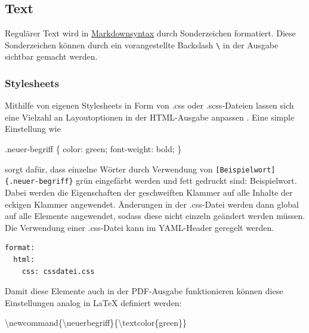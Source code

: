 \documentclass[
  letterpaper,
  DIV=11]{scrartcl}
\newenvironment{Shaded}{\begin{snugshade}}{\end{snugshade}}
\newcommand{\CharTok}[1]{\textcolor[rgb]{0.13,0.47,0.30}{#1}}
\newcommand{\ConstantTok}[1]{\textcolor[rgb]{0.56,0.35,0.01}{#1}}
\newcommand{\DecValTok}[1]{\textcolor[rgb]{0.68,0.00,0.00}{#1}}
\newcommand{\ExtensionTok}[1]{\textcolor[rgb]{0.00,0.23,0.31}{#1}}
\newcommand{\FunctionTok}[1]{\textcolor[rgb]{0.28,0.35,0.67}{#1}}
\newcommand{\KeywordTok}[1]{\textcolor[rgb]{0.00,0.23,0.31}{#1}}
\newcommand{\NormalTok}[1]{\textcolor[rgb]{0.00,0.23,0.31}{#1}}
\newcommand{\OperatorTok}[1]{\textcolor[rgb]{0.37,0.37,0.37}{#1}}
\begin{document}
\subsection{Text}\label{text}

Regulärer Text wird in
\href{https://quarto.org/docs/authoring/markdown-basics.html\#overview}{Markdownsyntax}
durch Sonderzeichen formatiert. Diese Sonderzeichen können durch ein
vorangestellte Backslash \texttt{\textbackslash{}} in der Ausgabe
sichtbar gemacht werden.

\subsubsection{Stylesheets}\label{stylesheets}

Mithilfe von eigenen Stylesheets in Form von .css oder .scss-Dateien
lassen sich eine Vielzahl an Layoutoptionen in der HTML-Ausgabe anpassen
\autocite{W3Schools-Stylesheets}. Eine simple Einstellung wie

\begin{Shaded}
\begin{Highlighting}[]
\FunctionTok{.neuer{-}begriff}\NormalTok{ \{ }
    \KeywordTok{color}\CharTok{:} \ConstantTok{green}\OperatorTok{;} 
    \KeywordTok{font{-}weight}\CharTok{:} \DecValTok{bold}\OperatorTok{;} 
\NormalTok{\}}
\end{Highlighting}
\end{Shaded}

sorgt dafür, dass einzelne Wörter durch Verwendung von
\texttt{{[}Beispielwort{]}\{.neuer-begriff\}} grün eingefärbt werden und
fett gedruckt sind: {Beispielwort}. Dabei werden die Eigenschaften der
geschweiften Klammer auf alle Inhalte der eckigen Klammer angewendet.
Änderungen in der .css-Datei werden dann global auf alle Elemente
angewendet, sodass diese nicht einzeln geändert werden müssen. Die
Verwendung einer .css-Datei kann im YAML-Header geregelt werden.

\begin{verbatim}
format:
  html: 
    css: cssdatei.css
\end{verbatim}

Damit diese Elemente auch in der PDF-Ausgabe funktionieren können diese
Einstellungen analog in LaTeX definiert werden:

\begin{Shaded}
\begin{Highlighting}[]
\FunctionTok{\textbackslash{}newcommand}\NormalTok{\{}\ExtensionTok{\textbackslash{}neuerbegriff}\NormalTok{\}\{}\FunctionTok{\textbackslash{}textcolor}\NormalTok{\{green\}\}}
\end{Highlighting}
\end{Shaded}
\end{document}
